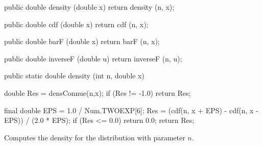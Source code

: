 \begin{code}\begin{hide}

   public double density (double x) {
      return density (n, x);
   }

   public double cdf (double x) {
      return cdf (n, x);
   }

   public double barF (double x) {
      return barF (n, x);
   }

   public double inverseF (double u) {
      return inverseF (n, u);
   }
\end{hide}

   public static double density (int n, double x)\begin{hide} {

      double Res = densConnue(n,x);
      if (Res != -1.0)
         return Res;

      final double EPS = 1.0 / Num.TWOEXP[6];
      Res = (cdf(n, x + EPS) - cdf(n, x - EPS)) / (2.0 * EPS);
      if (Res <= 0.0)
         return 0.0;
      return Res;
   }\end{hide}
\end{code}
\begin{tabb} Computes the density for the \ks{} distribution with parameter $n$.
\end{tabb}
